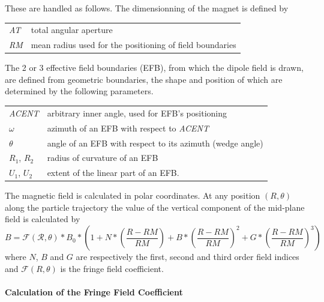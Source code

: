 \bigskip

\noindent These are handled as follows. The dimensionning of the magnet is defined by

\bigskip

 \begin{tabular}{>{\sl}l!{~:}l}
	 AT &  total angular aperture \\
	 RM & mean radius used for the positioning of field boundaries\\
 \end{tabular}

\bigskip

The 2 or 3 effective field boundaries (EFB), from which  the dipole field  is drawn, are
defined from geometric boundaries, the shape and position of which are determined by the 
following parameters. 

\bigskip

\begin{tabular}{l!{~:}l}
	 \textsl{ACENT} 
	    & arbitrary inner angle, used for EFB's positioning  \\
	$\omega$ &  azimuth of an EFB with respect to  \textsl{ACENT}\\
	$\theta$ & angle of an EFB with respect to its azimuth (wedge angle)\\ 
	$R_1$, $R_2$  &  radius of curvature of an EFB\\
	$U_1$, $U_2$  &  extent of the linear part of an EFB. 
\end{tabular}

\bigskip


 \noindent The magnetic field is calculated in  polar
coordinates. At  any position $(R,\theta)$ along the  particle trajectory 
the value of the vertical component of the mid-plane field is calculated by 
 \begin{equation}
	 B =  \mathcal{F(R,\theta)} \ast  B_0 \ast  
	      \left(1+N \ast  
	           \left( \frac{R-RM }{ RM}\right) 
	           + B \ast  \left(\frac{R-RM }{ RM} \right)^2 
	           + G \ast  \left(\frac{R-RM }{ RM} \right)^3 
	      \right) 
 \end{equation}
 where  $ N$, $B $ and $ G $ are  respectively  the first, second and
third order field indices and $ \mathcal{F}(R,\theta)$ is the fringe field coefficient. 


\paragraph{Calculation of the Fringe Field Coefficient} 

